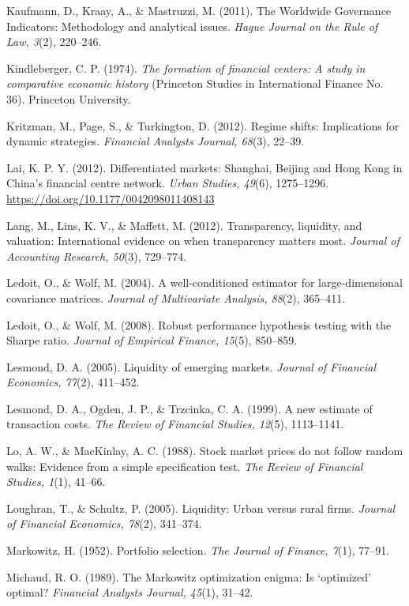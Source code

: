 \begin{list}{}{\setlength{\leftmargin}{1.5em}\setlength{\itemindent}{-1.5em}\setlength{\itemsep}{2pt}\small}
\item Kaufmann, D., Kraay, A., \& Mastruzzi, M. (2011). The Worldwide Governance Indicators: Methodology and analytical issues. \emph{Hague Journal on the Rule of Law, 3}(2), 220–246.
\item Kindleberger, C. P. (1974). \emph{The formation of financial centers: A study in comparative economic history} (Princeton Studies in International Finance No. 36). Princeton University.
\item Kritzman, M., Page, S., \& Turkington, D. (2012). Regime shifts: Implications for dynamic strategies. \emph{Financial Analysts Journal, 68}(3), 22–39.
\item Lai, K. P. Y. (2012). Differentiated markets: Shanghai, Beijing and Hong Kong in China’s financial centre network. \emph{Urban Studies, 49}(6), 1275–1296. \url{https://doi.org/10.1177/0042098011408143}
\item Lang, M., Lins, K. V., \& Maffett, M. (2012). Transparency, liquidity, and valuation: International evidence on when transparency matters most. \emph{Journal of Accounting Research, 50}(3), 729–774.
\item Ledoit, O., \& Wolf, M. (2004). A well-conditioned estimator for large-dimensional covariance matrices. \emph{Journal of Multivariate Analysis, 88}(2), 365–411.
\item Ledoit, O., \& Wolf, M. (2008). Robust performance hypothesis testing with the Sharpe ratio. \emph{Journal of Empirical Finance, 15}(5), 850–859.
\item Lesmond, D. A. (2005). Liquidity of emerging markets. \emph{Journal of Financial Economics, 77}(2), 411–452.
\item Lesmond, D. A., Ogden, J. P., \& Trzcinka, C. A. (1999). A new estimate of transaction costs. \emph{The Review of Financial Studies, 12}(5), 1113–1141.
\item Lo, A. W., \& MacKinlay, A. C. (1988). Stock market prices do not follow random walks: Evidence from a simple specification test. \emph{The Review of Financial Studies, 1}(1), 41–66.
\item Loughran, T., \& Schultz, P. (2005). Liquidity: Urban versus rural firms. \emph{Journal of Financial Economics, 78}(2), 341–374.
\item Markowitz, H. (1952). Portfolio selection. \emph{The Journal of Finance, 7}(1), 77–91.
\item Michaud, R. O. (1989). The Markowitz optimization enigma: Is `optimized' optimal? \emph{Financial Analysts Journal, 45}(1), 31–42.

\end{list}
